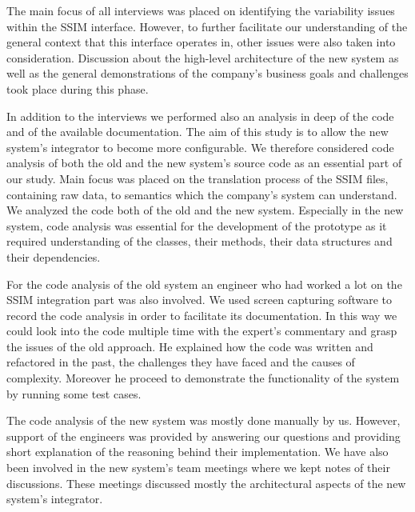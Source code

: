 The main focus of all interviews was placed on identifying the variability issues within the SSIM interface. However, to further facilitate our understanding of the general context that this interface operates in, other issues were also taken into consideration. Discussion about the high-level architecture of the new system as well as the general demonstrations of the company's business goals and challenges took place during this phase.

In addition to the interviews we performed also an analysis in deep of the code and of the available documentation. 
The aim of this study is to allow the new system's integrator to become more configurable. We therefore considered code analysis of both the old and the new system's source code as an essential part of our study. Main focus was placed on the translation process of the SSIM files, containing raw data, to semantics which the company's system can understand. We analyzed the code both of the old and the new system. Especially in the new system, code analysis was essential for the development of the prototype as it required understanding of the classes, their methods, their data structures and their dependencies. 

For the code analysis of the old system an engineer who had worked a lot on the SSIM integration part was also involved. We used screen capturing software to record the code analysis in order to facilitate its documentation. In this way we could look into the code multiple time with the expert's commentary and grasp the issues of the old approach. He explained how the code was written and refactored in the past, the challenges they have faced and the causes of complexity. Moreover he proceed to demonstrate the functionality of the system by running some test cases. 

The code analysis of the new system was mostly done manually by us. However, support of the engineers was provided by answering our questions and providing short explanation of the reasoning behind their implementation. We have also been involved in the new system's team meetings where we kept notes of their discussions. These meetings discussed mostly the architectural aspects of the new system's integrator. 


